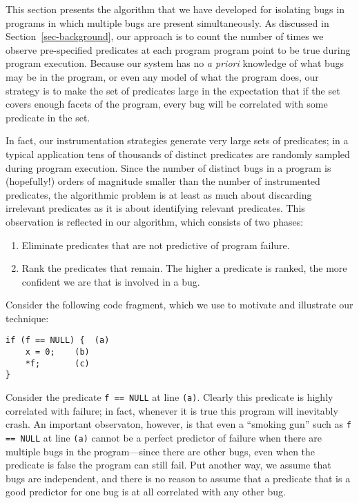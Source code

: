 
This section presents the algorithm that we have developed for
isolating bugs in programs in which multiple bugs are present
simultaneously.  As discussed in Section~\ref{sec-background}, our
approach is to count the number of times we observe pre-specified
predicates at each program program point to be true during program
execution.  Because our system has no {\em a priori} knowledge of what bugs
may be in the program, or even any model of what the program does, our
strategy is to make the set of predicates large in the expectation that
if the set covers enough facets of the program, every bug will be correlated
with some predicate in the set.

In fact, our instrumentation strategies generate very large sets
of predicates; in a typical application tens of thousands of distinct
predicates are randomly sampled during program execution.  Since the
number of distinct bugs in a program is (hopefully!) orders of
magnitude smaller than the number of instrumented predicates, the
algorithmic problem is at least as much about discarding irrelevant
predicates as it is about identifying relevant predicates.  This
observation is reflected in our algorithm, which consists of two phases:
\begin{enumerate}
\item Eliminate predicates that are not predictive of program failure.

\item Rank the predicates that remain.  The higher a predicate is ranked,
the more confident we are that is involved in a bug.
\end{enumerate}

Consider the following code fragment, which we use to motivate and illustrate
our technique:
\begin{verbatim}
if (f == NULL) {  (a)
	x = 0;    (b)
	*f;       (c)
}
\end{verbatim}
Consider the predicate {\tt f == NULL} at line {\tt (a)}.  Clearly
this predicate is highly correlated with failure; in fact, whenever it
is true this program will inevitably crash.  An important observaton,
however, is that even a ``smoking gun'' such as {\tt f == NULL} at
line {\tt (a)} cannot be a perfect predictor of failure when there are
multiple bugs in the program---since there are other bugs, even when
the predicate is false the program can still fail.  Put another way, we assume
that bugs are independent, and there is no reason to assume that
a predicate that is a good predictor for one bug is at all correlated
with any other bug.

